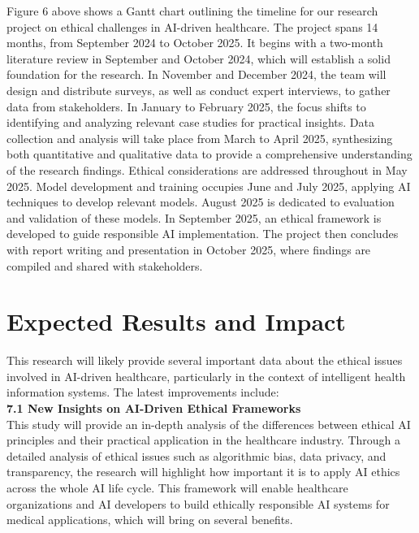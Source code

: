 \documentclass[a4paper, 12pt]{article}
\begin{document}
Figure 6 above shows a Gantt chart outlining the timeline for our research project on ethical challenges in AI-driven healthcare. The project spans 14 months, from September 2024 to October 2025. It begins with a two-month literature review in September and October 2024, which will establish a solid foundation for the research. In November and December 2024, the team will design and distribute surveys, as well as conduct expert interviews, to gather data from stakeholders. In January to February 2025, the focus shifts to identifying and analyzing relevant case studies for practical insights. Data collection and analysis will take place from March to April 2025, synthesizing both quantitative and qualitative data to provide a comprehensive understanding of the research findings. Ethical considerations are addressed throughout in May 2025. Model development and training occupies June and July 2025, applying AI techniques to develop relevant models. August 2025 is dedicated to evaluation and validation of these models. In September 2025, an ethical framework is developed to guide responsible AI implementation. The project then concludes with report writing and presentation in October 2025, where findings are compiled and shared with stakeholders.

\pagebreak

\section{Expected Results and Impact}
This research will likely provide several important data about the ethical issues involved in AI-driven healthcare, particularly in the context of intelligent health information systems. The latest improvements include:\\

\textbf{7.1 \hspace{5mm} New Insights on AI-Driven Ethical Frameworks}\\
This study will provide an in-depth analysis of the differences between ethical AI principles and their practical application in the healthcare industry. Through a detailed analysis of ethical issues such as algorithmic bias, data privacy, and transparency, the research will highlight how important it is to apply AI ethics across the whole AI life cycle. This framework will enable healthcare organizations and AI developers to build ethically responsible AI systems for medical applications, which will bring on several benefits.\\
\end{document}
